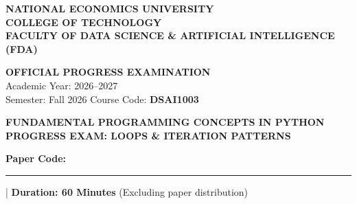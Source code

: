 \documentclass[11pt,a4paper]{article}
\begin{document}

\noindent
\begin{minipage}[t]{0.64\textwidth}
  \raggedright\small
  \textbf{NATIONAL ECONOMICS UNIVERSITY}\\
  \textbf{COLLEGE OF TECHNOLOGY}\\
  \textbf{FACULTY OF DATA SCIENCE \& ARTIFICIAL INTELLIGENCE (FDA)}
\end{minipage}%
\hfill
\begin{minipage}[t]{0.34\textwidth}
  \raggedleft\footnotesize
  \textbf{OFFICIAL PROGRESS EXAMINATION}\\
  Academic Year: 2026--2027\\
  Semester: Fall 2026 \quad Course Code: \textbf{DSAI1003}
\end{minipage}

\vspace{0.15em}

\begin{center}
  {\Large\bfseries\color{primaryblue} FUNDAMENTAL PROGRAMMING CONCEPTS IN PYTHON}\\[0.08em]
  {\normalsize\bfseries PROGRESS EXAM: LOOPS \& ITERATION PATTERNS}\\[0.08em]
  {\normalsize\textbf{Paper Code:} \rule{1.6cm}{0.4pt} \quad | \quad \textbf{Duration: 60 Minutes} (Excluding paper distribution)}
\end{center}

\vspace{0.05em}
\end{document}
